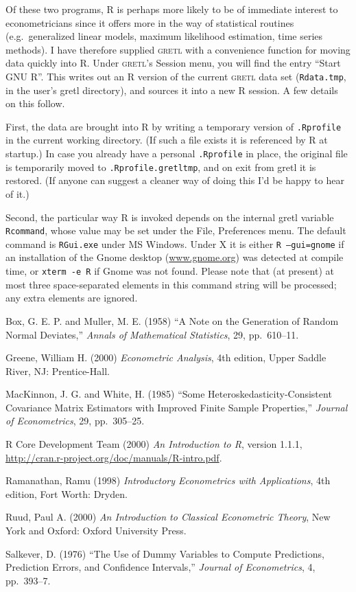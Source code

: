 \documentclass{article}
\begin{document}
Of these two programs, R is perhaps more likely to be of immediate
interest to econometricians since it offers more in the way of
statistical routines (e.g.\ generalized linear models, maximum
likelihood estimation, time series methods).  I have therefore
supplied \textsc{gretl} with a convenience function for moving data
quickly into R.  Under \textsc{gretl}'s Session menu, you will find
the entry ``Start GNU R''.  This writes out an R version of the
current \textsc{gretl} data set (\texttt{Rdata.tmp}, in the user's
gretl directory), and sources it into a new R session.  A few details
on this follow.

First, the data are brought into R by writing a temporary version of
\texttt{.Rprofile} in the current working directory.  (If such a file
exists it is referenced by R at startup.)  In case you already have a
personal \texttt{.Rprofile} in place, the original file is temporarily
moved to \texttt{.Rprofile.gretltmp}, and on exit from \textsf{gretl}
it is restored.  (If anyone can suggest a cleaner way of doing this
I'd be happy to hear of it.)

Second, the particular way R is invoked depends on the internal
\textsf{gretl} variable \texttt{Rcommand}, whose value may be set
under the File, Preferences menu.  The default command is
\texttt{RGui.exe} under MS Windows.  Under X it is either \texttt{R
  --gui=gnome} if an installation of the Gnome desktop
(\url{www.gnome.org}) was detected at compile time, or \texttt{xterm
  -e R} if Gnome was not found.  Please note that (at present) at most
three space-separated elements in this command string will be
processed; any extra elements are ignored.



\begin{thebibliography}{}
\label{sec:biblio}

Box, G. E. P. and Muller, M. E. (1958) ``A Note on the Generation of
Random Normal Deviates,'' \textit{Annals of Mathematical Statistics},
29, pp.\ 610--11.
  
Greene, William H. (2000) \textit{Econometric Analysis}, 4th edition,
Upper Saddle River, NJ: Prentice-Hall.

MacKinnon, J. G. and White, H. (1985) ``Some
Heteroskedasticity-Consistent Covariance Matrix Estimators with
Improved Finite Sample Properties,'' \textit{Journal of Econometrics},
29, pp.\ 305--25.

R Core Development Team (2000) \textit{An Introduction to R}, version
1.1.1, \url{http://cran.r-project.org/doc/manuals/R-intro.pdf}.

Ramanathan, Ramu (1998) \textit{Introductory Econometrics with
  Applications}, 4th edition, Fort Worth: Dryden.

Ruud, Paul A. (2000) \textit{An Introduction to Classical Econometric
  Theory}, New York and Oxford: Oxford University Press.

Salkever, D. (1976) ``The Use of Dummy Variables to Compute
Predictions, Prediction Errors, and Confidence Intervals,''
\textit{Journal of Econometrics}, 4, pp.\ 393--7.

\end{thebibliography}
\end{document}
